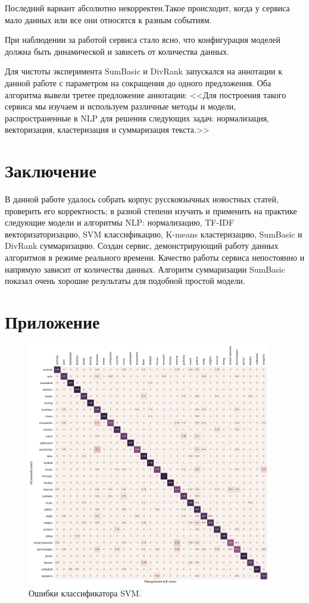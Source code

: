 \documentclass[a4paper, 14pt]{extarticle}
\begin{document}
Последний вариант абсолютно некорректен.Такое происходит, когда у сервиса мало данных или все они относятся к разным событиям.

При наблюдении за работой сервиса стало ясно, что конфигурация моделей должна быть динамической и зависеть от количества данных.

Для чистоты эксперимента SumBasic и DivRank запускался на аннотации к данной работе с параметром на сокращения до одного предложения. Оба алгоритма вывели третее предложение аннотации: <<Для построения такого сервиса мы изучаем и используем различные методы и модели, распространенные в NLP для решения следующих задач: нормализация, векторизация, кластеризация и суммаризация текста.>>

\section{Заключение}
В данной работе удалось собрать корпус русскоязычных новостных статей, проверить его корректность; в разной степени изучить и применить на практике следующие модели и алгоритмы NLP: нормализацию, TF-IDF векторизаторизацию, SVM классификацию, K-means кластеризацию, SumBasic и DivRank суммаризацию. Создан сервис, демонстрирующий работу данных алгоритмов в режиме реального времени. Качество работы сервиса непостоянно и напрямую зависит от количества данных.
Алгоритм суммаризации SumBasic показал очень хорошие результаты для подобной простой модели.


\clearpage
\section*{Приложение}

\begin{figure}[h!]
	\centering
	\includegraphics[width=0.95\textwidth]{svm_matrix}
	\caption{Ошибки классификатора SVM.}
	\label{svm_matrix}
\end{figure}
\end{document}
